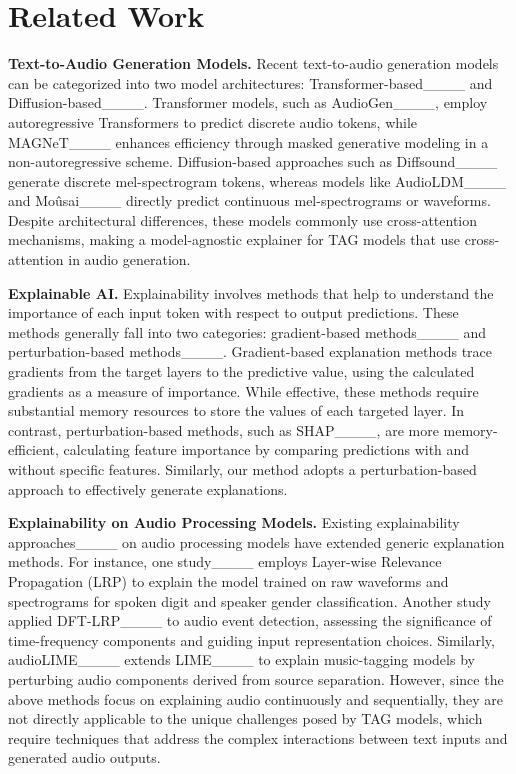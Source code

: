 \section{Related Work}
\label{sec:related}

\textbf{Text-to-Audio Generation Models.} Recent text-to-audio generation models can be categorized into two model architectures: Transformer-based____ and Diffusion-based____. Transformer models, such as AudioGen____, employ autoregressive Transformers to predict discrete audio tokens, while MAGNeT____ enhances efficiency through masked generative modeling in a non-autoregressive scheme. Diffusion-based approaches such as Diffsound____ generate discrete mel-spectrogram tokens, whereas models like AudioLDM____ and Moûsai____ directly predict continuous mel-spectrograms or waveforms. Despite architectural differences, these models commonly use cross-attention mechanisms, making \mname{} a model-agnostic explainer for TAG models that use cross-attention in audio generation.

\textbf{Explainable AI.}  Explainability involves methods that help to understand the importance of each input token with respect to output predictions. These methods generally fall into two categories: gradient-based methods____ and perturbation-based methods____. Gradient-based explanation methods trace gradients from the target layers to the predictive value, using the calculated gradients as a measure of importance. While effective, these methods require substantial memory resources to store the values of each targeted layer. In contrast, perturbation-based methods, such as SHAP____, are more memory-efficient, calculating feature importance by comparing predictions with and without specific features. Similarly, our method adopts a perturbation-based approach to effectively generate explanations.

\textbf{Explainability on Audio Processing Models.} Existing explainability approaches____ on audio processing models have extended generic explanation methods. For instance, one study____ employs Layer-wise Relevance Propagation (LRP) to explain the model trained on raw waveforms and spectrograms for spoken digit and speaker gender classification. Another study applied DFT-LRP____ to audio event detection, assessing the significance of time-frequency components and guiding input representation choices. Similarly, audioLIME____ extends LIME____ to explain music-tagging models by perturbing audio components derived from source separation. However, since the above methods focus on explaining audio continuously and sequentially, they are not directly applicable to the unique challenges posed by TAG models, which require techniques that address the complex interactions between text inputs and generated audio outputs.

